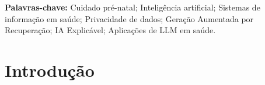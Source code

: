 \documentclass[12pt]{article}
\begin{document}
\noindent \textbf{Palavras-chave:} Cuidado pré-natal; Inteligência artificial; Sistemas de informação em saúde; Privacidade de dados; Geração Aumentada por Recuperação; IA Explicável; Aplicações de LLM em saúde.


\section{Introdução}



\end{document}
